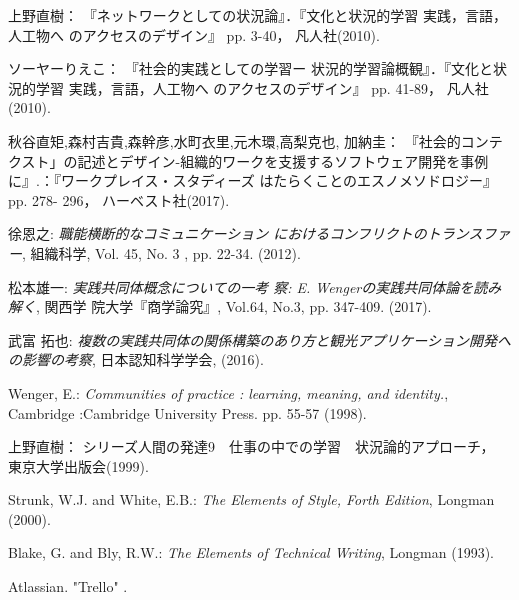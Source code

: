 \documentclass[submit,techrep]{ipsj}
\begin{document}
\begin{thebibliography}{9}

上野直樹：
『ネットワークとしての状況論』．『文化と状況的学習 実践，言語，人工物へ のアクセスのデザイン』 pp. 3-40，
凡人社(2010).

ソーヤーりえこ：
『社会的実践としての学習ー 状況的学習論概観』．『文化と状況的学習 実践，言語，人工物へ のアクセスのデザイン』 pp. 41-89，
凡人社(2010).

秋谷直矩,森村吉貴,森幹彦,水町衣里,元木環,高梨克也, 加納圭：
『社会的コンテクスト」の記述とデザイン-組織的ワークを支援するソフトウェア開発を事例に』.：『ワークプレイス・スタディーズ はたらくことのエスノメソドロジー』 pp. 278- 296，
ハーベスト社(2017).

徐恩之: {\it 職能横断的なコミュニケーション
におけるコンフリクトのトランスファー},
組織科学,
Vol. 45, No. 3 , pp. 22-34. (2012).

松本雄一: {\it 実践共同体概念についての一考 察: E. Wengerの実践共同体論を読み解く},
関西学 院大学『商学論究』,
Vol.64, No.3, pp. 347-409. (2017).

武富 拓也: {\it 複数の実践共同体の関係構築のあり方と観光アプリケーション開発への影響の考察},
日本認知科学学会,
(2016).

Wenger, E.: {\it Communities of practice : learning,
meaning, and identity.},
Cambridge :Cambridge University
Press. pp. 55-57 (1998).

上野直樹：
シリーズ人間の発達9　仕事の中での学習　状況論的アプローチ，
東京大学出版会(1999).

Strunk, W.J. and White, E.B.: {\it The Elements of Style, Forth Edition},
Longman (2000).

Blake, G. and Bly, R.W.: {\it The Elements of Technical Writing},
Longman (1993).

Atlassian.
"Trello"
%
.


\end{thebibliography}

\begin{biography}
%
%
\end{biography}
\end{document}
